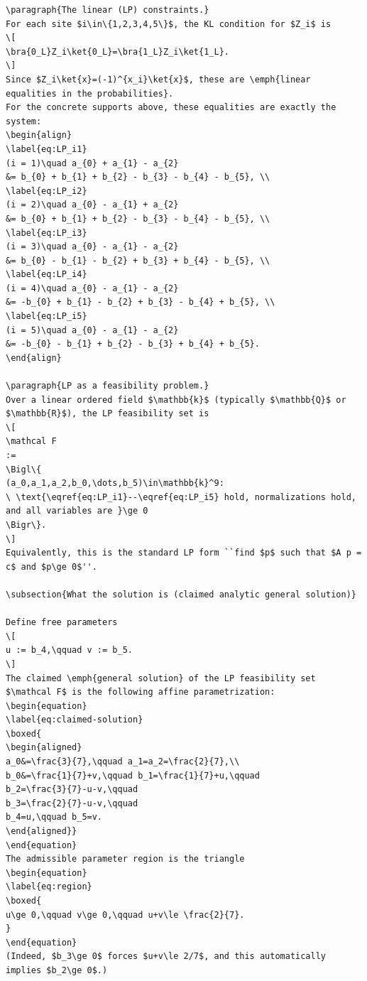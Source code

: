 \documentclass[11pt]{article}
\begin{document}
\begin{verbatim}
\paragraph{The linear (LP) constraints.}
For each site $i\in\{1,2,3,4,5\}$, the KL condition for $Z_i$ is
\[
\bra{0_L}Z_i\ket{0_L}=\bra{1_L}Z_i\ket{1_L}.
\]
Since $Z_i\ket{x}=(-1)^{x_i}\ket{x}$, these are \emph{linear equalities in the probabilities}.
For the concrete supports above, these equalities are exactly the system:
\begin{align}
\label{eq:LP_i1}
(i = 1)\quad a_{0} + a_{1} - a_{2}
&= b_{0} + b_{1} + b_{2} - b_{3} - b_{4} - b_{5}, \\
\label{eq:LP_i2}
(i = 2)\quad a_{0} - a_{1} + a_{2}
&= b_{0} + b_{1} + b_{2} - b_{3} - b_{4} - b_{5}, \\
\label{eq:LP_i3}
(i = 3)\quad a_{0} - a_{1} - a_{2}
&= b_{0} - b_{1} - b_{2} + b_{3} + b_{4} - b_{5}, \\
\label{eq:LP_i4}
(i = 4)\quad a_{0} - a_{1} - a_{2}
&= -b_{0} + b_{1} - b_{2} + b_{3} - b_{4} + b_{5}, \\
\label{eq:LP_i5}
(i = 5)\quad a_{0} - a_{1} - a_{2}
&= -b_{0} - b_{1} + b_{2} - b_{3} + b_{4} + b_{5}.
\end{align}

\paragraph{LP as a feasibility problem.}
Over a linear ordered field $\mathbb{k}$ (typically $\mathbb{Q}$ or $\mathbb{R}$), the LP feasibility set is
\[
\mathcal F
:=
\Bigl\{
(a_0,a_1,a_2,b_0,\dots,b_5)\in\mathbb{k}^9:
\ \text{\eqref{eq:LP_i1}--\eqref{eq:LP_i5} hold, normalizations hold, and all variables are }\ge 0
\Bigr\}.
\]
Equivalently, this is the standard LP form ``find $p$ such that $A p = c$ and $p\ge 0$''.

\subsection{What the solution is (claimed analytic general solution)}

Define free parameters
\[
u := b_4,\qquad v := b_5.
\]
The claimed \emph{general solution} of the LP feasibility set $\mathcal F$ is the following affine parametrization:
\begin{equation}
\label{eq:claimed-solution}
\boxed{
\begin{aligned}
a_0&=\frac{3}{7},\qquad a_1=a_2=\frac{2}{7},\\
b_0&=\frac{1}{7}+v,\qquad b_1=\frac{1}{7}+u,\qquad
b_2=\frac{3}{7}-u-v,\qquad
b_3=\frac{2}{7}-u-v,\qquad
b_4=u,\qquad b_5=v.
\end{aligned}}
\end{equation}
The admissible parameter region is the triangle
\begin{equation}
\label{eq:region}
\boxed{
u\ge 0,\qquad v\ge 0,\qquad u+v\le \frac{2}{7}.
}
\end{equation}
(Indeed, $b_3\ge 0$ forces $u+v\le 2/7$, and this automatically implies $b_2\ge 0$.)


\end{verbatim}
\end{document}
